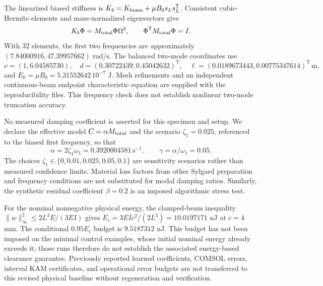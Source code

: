 The linearized biased stiffness is
$K_b=K_{\rm beam}+\mu B_0s_Ls_L^{\mathsf T}$.
Consistent cubic-Hermite elements and mass-normalized eigenvectors give
\[
 K_b\Phi=M_{\rm total}\Phi\Omega^2,
 \qquad \Phi^{\mathsf T}M_{\rm total}\Phi=I.
\]
With $32$ elements, the first two frequencies are approximately
$(7.84000916,47.39957662)$ rad/s. The balanced two-mode coordinates use
\[
 \nu=(1,6.04585730),\quad
 d=(0.30722439,0.45042632)^{\mathsf T},\quad
 \ell=(0.0189673443,0.00775347614)^{\mathsf T}\,\mathrm m,
\]
and $E_0=\mu B_0=5.31552642\,10^{-7}$ J.
Mesh refinements and an independent continuous-beam endpoint characteristic
equation are supplied with the reproducibility files. This frequency check
does not establish nonlinear two-mode truncation accuracy.

No measured damping coefficient is asserted for this specimen and setup.
We declare the effective model $C=\alpha M_{\rm total}$ and the scenario
$\zeta_1=0.025$, referenced to the biased first frequency, so that
\[
 \alpha=2\zeta_1\omega_1=0.3920004581\,\mathrm{s^{-1}},
 \qquad \gamma=\alpha/\omega_1=0.05.
\]
The choices $\zeta_1\in\{0,0.01,0.025,0.05,0.1\}$ are sensitivity
scenarios rather than measured confidence limits. Material loss factors from
other Sylgard preparation and frequency conditions \cite{fischer2017adhesion}
are not substituted for modal damping ratios. Similarly, the synthetic
residual coefficient $\beta=0.2$ is an imposed algorithmic stress test.

For the nominal nonnegative physical energy, the clamped-beam inequality
$\|w\|_\infty^2\leq2L^3E/(3EI)$ gives
$E_c=3EIc^2/(2L^3)=10.0197171$ nJ at $c=4$ mm.
The conditional $0.95E_c$ budget is $9.5187312$ nJ.
This budget has not been imposed on the minimal control examples, whose
initial nominal energy already exceeds it; those runs therefore do not
establish the associated energy-based clearance guarantee.
Previously reported learned coefficients, COMSOL errors, interval KAM
certificates, and operational error budgets are not transferred to this
revised physical baseline without regeneration and verification.

